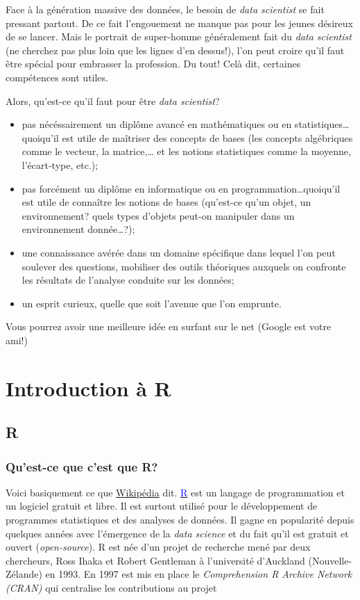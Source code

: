 \documentclass[]{book}
\begin{document}
Face à la génération massive des données, le besoin de \emph{data
scientist} se fait pressant partout. De ce fait l'engouement ne manque
pas pour les jeunes désireux de se lancer. Mais le portrait de
super-homme généralement fait du \emph{data scientist} (ne cherchez pas
plus loin que les lignes d'en dessus!), l'on peut croire qu'il faut être
spécial pour embrasser la profession. Du tout! Celà dit, certaines
compétences sont utiles.

Alors, qu'est-ce qu'il faut pour être \emph{data scientist}?

\begin{itemize}
\item
  pas nécéssairement un diplôme avancé en mathématiques ou en
  statistiques\ldots{}quoiqu'il est utile de maîtriser des concepts de
  bases (les concepts algébriques comme le vecteur, la matrice,\ldots{}
  et les notions statistiques comme la moyenne, l'écart-type, etc.);
\item
  pas forcément un diplôme en informatique ou en
  programmation\ldots{}quoiqu'il est utile de connaître les notions de
  bases (qu'est-ce qu'un objet, un environnement? quels types d'objets
  peut-on manipuler dans un environnement donnée\ldots{}?);
\item
  une connaissance avérée dans un domaine spécifique dans lequel l'on
  peut soulever des questions, mobiliser des outils théoriques auxquels
  on confronte les résultats de l'analyse conduite sur les données;
\item
  un esprit curieux, quelle que soit l'avenue que l'on emprunte.
\end{itemize}

Vous pourrez avoir une meilleure idée en surfant sur le net (Google est
votre ami!)

\chapter{Introduction à R}\label{introduction-a-r}

\section{R}\label{r}

\subsection{Qu'est-ce que c'est que R?}\label{quest-ce-que-cest-que-r}

Voici basiquement ce que
\href{https://fr.wikipedia.org/wiki/R_(langage)}{Wikipédia} dit.
\href{http://r-project.org}{\textcolor{blue}{R}} est un langage de
programmation et un logiciel gratuit et libre. Il est surtout utilisé
pour le développement de programmes statistiques et des analyses de
données. Il gagne en popularité depuis quelques années avec l'émergence
de la \emph{data science} et du fait qu'il est gratuit et ouvert
(\emph{open-source}). R est née d'un projet de recherche mené par deux
chercheurs, Ross Ihaka et Robert Gentleman à l'université d'Auckland
(Nouvelle-Zélande) en 1993. En 1997 est mis en place le
\emph{Comprehension R Archive Network (CRAN)} qui centralise les
contributions au projet
\end{document}
